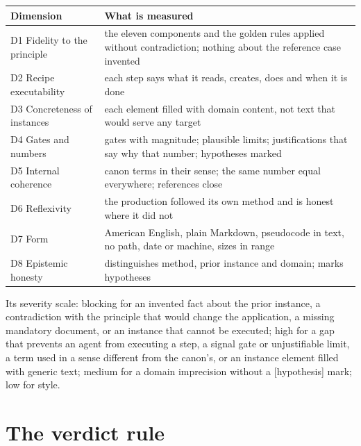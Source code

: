 \documentclass[
  american,
  10pt,
]{report}
\newcounter{none} %
\renewcommand{\texttt}[1]{{\ttfamily\hyphenchar\font=-1 #1}}
\begin{document}
{\def\LTcaptype{none} %
\begin{longtable}[]{@{}
  >{\raggedright\arraybackslash}p{}
  >{\raggedright\arraybackslash}p{}@{}}
\toprule\noalign{}
\begin{minipage}[b]{\linewidth}\raggedright
Dimension
\end{minipage} & \begin{minipage}[b]{\linewidth}\raggedright
What is measured
\end{minipage} \\
\midrule\noalign{}
\endhead
\bottomrule\noalign{}
\endlastfoot
D1 Fidelity to the principle & the eleven components and the golden
rules applied without contradiction; nothing about the reference case
invented \\
D2 Recipe executability & each step says what it reads, creates, does
and when it is done \\
D3 Concreteness of instances & each element filled with domain content,
not text that would serve any target \\
D4 Gates and numbers & gates with magnitude; plausible limits;
justifications that say why that number; hypotheses marked \\
D5 Internal coherence & canon terms in their sense; the same number
equal everywhere; references close \\
D6 Reflexivity & the production followed its own method and is honest
where it did not \\
D7 Form & American English, plain Markdown, pseudocode in \texttt{text},
no path, date or machine, sizes in range \\
D8 Epistemic honesty & distinguishes method, prior instance and domain;
marks hypotheses \\
\end{longtable}
}

Its severity scale: \texttt{blocking} for an invented fact about the
prior instance, a contradiction with the principle that would change the
application, a missing mandatory document, or an instance that cannot be
executed; \texttt{high} for a gap that prevents an agent from executing
a step, a signal gate or unjustifiable limit, a term used in a sense
different from the canon's, or an instance element filled with generic
text; \texttt{medium} for a domain imprecision without a
\texttt{[hypothesis]} mark; \texttt{low} for style.

\section{The verdict rule}\label{the-verdict-rule}
\end{document}
